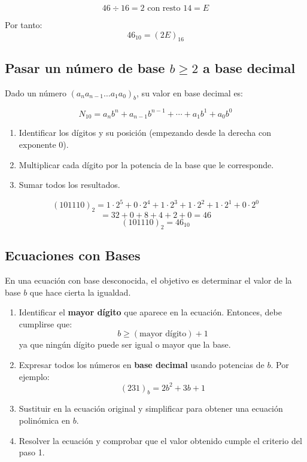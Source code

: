 \documentclass[a4paper,12pt]{article}
\begin{document}
\begin{ejemplo}[title={Pasar \(46_{10}\) a base \(16\)}]
\[
46 \div 16 = 2 \text{ con resto } 14 = E
\]

Por tanto:
\[
46_{10} = (2E)_{16}
\]
\end{ejemplo}

\subsection{Pasar un número de base \(b\ge2\) a base decimal}

\begin{procedimiento}
Dado un número \( (a_n a_{n-1} \ldots a_1 a_0)_b \), su valor en base decimal es:

\[
N_{10} = a_n b^n + a_{n-1} b^{n-1} + \cdots + a_1 b^1 + a_0 b^0
\]

\begin{enumerate}
    \item Identificar los dígitos y su posición (empezando desde la derecha con exponente 0).
    \item Multiplicar cada dígito por la potencia de la base que le corresponde.
    \item Sumar todos los resultados.
\end{enumerate}
\end{procedimiento}

\begin{ejemplo}[title={Pasar \((101110)_2\) a base decimal}]
\[
(101110)_2 = 1\cdot 2^5 + 0\cdot 2^4 + 1\cdot 2^3 + 1\cdot 2^2 + 1\cdot 2^1 + 0\cdot 2^0
\]
\[
= 32 + 0 + 8 + 4 + 2 + 0 = 46
\]
\[
(101110)_2 = 46_{10}
\]
\end{ejemplo}

\subsection{Ecuaciones con Bases}

\begin{procedimiento}[title=Encontrar la base]
En una ecuación con base desconocida, el objetivo es determinar el valor de la base \( b \) que hace cierta la igualdad.

\begin{enumerate}
    \item Identificar el \textbf{mayor dígito} que aparece en la ecuación.  
    Entonces, debe cumplirse que:
    \[
    b \geq (\text{mayor dígito}) + 1
    \]
    ya que ningún dígito puede ser igual o mayor que la base.

    \item Expresar todos los números en \textbf{base decimal} usando potencias de \( b \).  
    Por ejemplo:
    \[
    (231)_b = 2b^2 + 3b + 1
    \]

    \item Sustituir en la ecuación original y simplificar para obtener una ecuación polinómica en \( b \).

    \item Resolver la ecuación y comprobar que el valor obtenido cumple el criterio del paso 1.
\end{enumerate}
\end{procedimiento}
\end{document}

